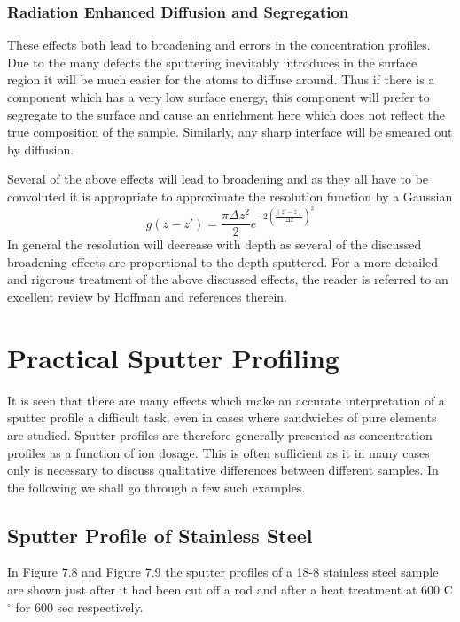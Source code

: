  \subsubsection{Radiation Enhanced Diffusion and Segregation}
 These effects both lead to broadening and errors in the
 concentration profiles. Due to the many defects the
 sputtering inevitably introduces in the surface region it
 will be much easier for the atoms to diffuse around. Thus if
 there is a component which has a very low surface energy, this
 component will prefer to segregate to the surface and cause
 an enrichment here which does not reflect the true
 composition of the sample. Similarly, any sharp interface
 will be smeared out by diffusion.

 Several of the above effects will lead to broadening and as
 they all have to be convoluted it is appropriate to
 approximate the resolution function by a Gaussian
 \begin{equation}
 g(z-z')=\frac{\pi  \Delta
 z^{2}}{2}e^{-2(\frac{(z'-z)}{\Delta z})^{2}}
 \end{equation}
 In general the resolution will decrease with depth as several
 of the discussed broadening effects are proportional to the
 depth sputtered. For a more detailed and rigorous treatment
 of the above discussed effects, the reader is referred to an
 excellent review by Hoffman \cite{hoffman} and references
 therein.


 \section{Practical Sputter Profiling}

 It is seen that there are many effects which make an
 accurate interpretation of a sputter profile a difficult
 task, even in cases where sandwiches of pure elements are
 studied. Sputter profiles are therefore generally presented
 as concentration profiles as a function of ion dosage. This
 is often sufficient as it in many cases only is necessary to
 discuss qualitative differences between different samples. In
 the following we shall go through a few such examples.

 \subsection{Sputter Profile of Stainless Steel}

 In Figure 7.8 and Figure 7.9 the sputter profiles of a
 18-8 stainless steel sample are shown just after it had been
 cut off a rod and after a heat treatment at 600 C$^{\circ}$
 for 600 sec respectively.

